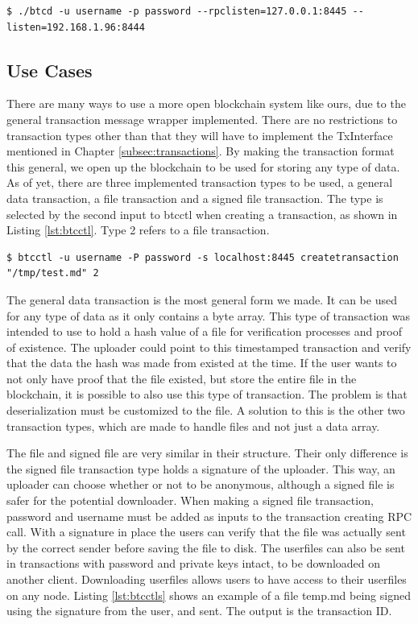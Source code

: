 \documentclass[12pt]{article}
\begin{document}
\begin{lstlisting}[float=h!,caption={Start-up command example},label=lst:start]
$ ./btcd -u username -p password --rpclisten=127.0.0.1:8445 --listen=192.168.1.96:8444 
\end{lstlisting}

\subsection{Use Cases}
There are many ways to use a more open blockchain system like ours, due to the general transaction message wrapper implemented. There are no restrictions to transaction types other than that they will have to implement the TxInterface mentioned in Chapter \ref{subsec:transactions}. By making the transaction format this general, we open up the blockchain to be used for storing any type of data. As of yet, there are three implemented transaction types to be used, a general data transaction, a file transaction and a signed file transaction. The type is selected by the second input to btcctl when creating a transaction, as shown in Listing \ref{lst:btcctl}. Type 2 refers to a file transaction.

\begin{lstlisting}[float=h!,caption={Transaction creation command example},label=lst:btcctl]
$ btcctl -u username -P password -s localhost:8445 createtransaction "/tmp/test.md" 2
\end{lstlisting}

The general data transaction is the most general form we made. It can be used for any type of data as it only contains a byte array. This type of transaction was intended to use to hold a hash value of a file for verification processes and proof of existence. The uploader could point to this timestamped transaction and verify that the data the hash was made from existed at the time. If the user wants to not only have proof that the file existed, but store the entire file in the blockchain, it is possible to also use this type of transaction. The problem is that deserialization must be customized to the file. A solution to this is the other two transaction types, which are made to handle files and not just a data array. 

The file and signed file are very similar in their structure. Their only difference is the signed file transaction type holds a signature of the uploader. This way, an uploader can choose whether or not to be anonymous, although a signed file is safer for the potential downloader. When making a signed file transaction, password and username must be added as inputs to the transaction creating RPC call. With a signature in place the users can verify that the file was actually sent by the correct sender before saving the file to disk. The userfiles can also be sent in transactions with password and private keys intact, to be downloaded on another client. Downloading userfiles allows users to have access to their userfiles on any node. Listing \ref{lst:btcctls} shows an example of a file temp.md being signed using the signature from the user, and sent. The output is the transaction ID.
\end{document}
